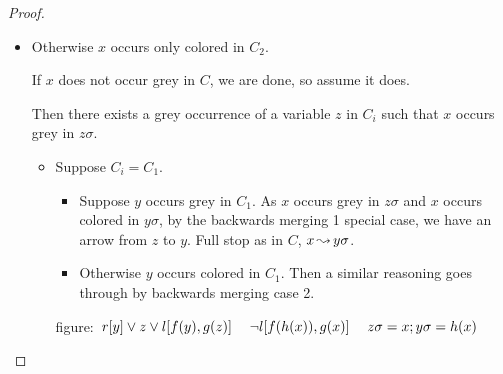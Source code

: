 \documentclass[,%
	paper=a4,%
	DIV9, %
	twoside=false,%
	liststotoc,
	bibtotoc,
	draft=false,%
	numbers=noendperiod
]{scrartcl}
\begin{document}
\begin{proof}
\begin{description}
\begin{itemize}
\begin{itemize}
					\item

					Otherwise $x$ occurs only colored in $C_2$.


					If $x$ does not occur grey in $C$, we are done, so assume it does.

					Then there exists a grey occurrence of a variable $z$ in $C_i$ such that $x$ occurs grey in $z\sigma$.

					\begin{itemize}
						\item Suppose $C_i = C_1$.

							\begin{itemize}
								\item
									Suppose $y$ occurs grey in $C_1$.
									As $x$ occurs grey in $z\sigma$ and $x$ occurs colored in $y\sigma$, by the backwards merging 1 special case, we have an arrow from $z$ to $y$. Full stop as in $C$, $x\operatorname{\leadsto} y\sigma$.

								\item
									Otherwise $y$ occurs colored in $C_1$. Then a similar reasoning goes through by backwards merging case 2.
							\end{itemize}

							\mbox{figure: $ r[y] \lor z \lor l[f(y), g(z)]\quad\; \lnot l[f(h(x)), g(x)]\;\quad z\sigma = x;y\sigma=h(x)$}



\end{itemize}
\end{itemize}
\end{itemize}
\end{description}
\end{proof}
\end{document}
